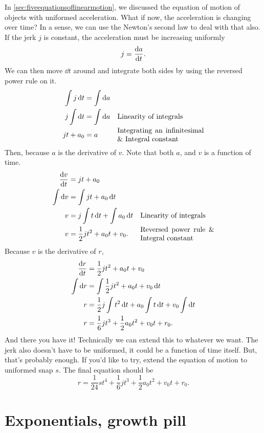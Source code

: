 In \cref{sec:fiveequationsoflinearmotion}, we discussed the equation of motion of objects with uniformed acceleration. What if now, the acceleration is changing over time? In a sense, we can use the Newton's second law to deal with that also. If the jerk $j$ is constant, the acceleration must be increasing uniformly
\begin{equation*}
    j = \dv{a}{t}.
\end{equation*}
We can then move $\dd{t}$ around and integrate both sides by using the reversed power rule on it.
\begin{align*}
    \int j\dd{t} &= \int\dd{a} \\
    j\int \dd{t} &= \int\dd{a} \alc[0.35]{Linearity of integrals} \\
    jt + a_0 &= a \alc[0.35]{Integrating an infinitesimal \& Integral constant}
\end{align*}
Then, because $a$ is the derivative of $v$. Note that both $a$, and $v$ is a function of time.
\begin{align*}
    \dv{v}{t} &= jt + a_0 \\
    \int \dd{v} &= \int jt + a_0 \dd{t} \\
    v &= j\int t\dd{t} + \int a_0\dd{t} \alc{Linearity of integrals} \\
    v &= \frac{1}{2}jt^2 + a_0t + v_0. \alc{Reversed power rule \& Integral constant} \\
\end{align*}
Because $v$ is the derivative of $r$,
\begin{align*}
    \dv{r}{t} &= \frac{1}{2}jt^2 + a_0t + v_0 \\
    \int \dd{r} &= \int\frac{1}{2}jt^2 + a_0t + v_0 \dd{t} \\
    r &= \frac{1}{2}j\int t^2\dd{t} + a_0\int t\dd{t} + v_0\int\dd{t} \\
    r &= \frac{1}{6}jt^3 + \frac{1}{2}a_0t^2 + v_0t + r_0.
\end{align*}
And there you have it! Technically we can extend this to whatever we want. The jerk also doesn't have to be uniformed, it could be a function of time itself. But, that's probably enough. If you'd like to try, extend the equation of motion to uniformed snap $s$. The final equation should be
\begin{equation*}
    r = \frac{1}{24}st^4 + \frac{1}{6}jt^3 + \frac{1}{2}a_0t^2 + v_0t + r_0.
\end{equation*}

\section{Exponentials, growth pill}

